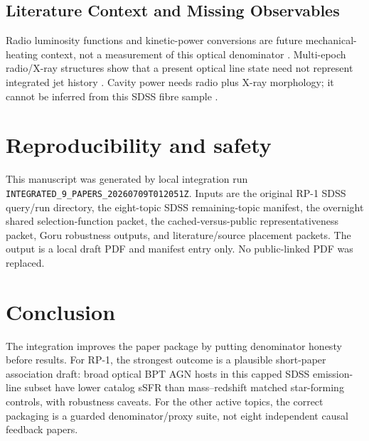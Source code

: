 \documentclass[twocolumn]{aastex702}
\begin{document}
\subsection{Literature Context and Missing Observables}

Radio luminosity functions and kinetic-power conversions are future mechanical-heating context, not a measurement of this optical denominator \citep{kondapally2023}. Multi-epoch radio/X-ray structures show that a present optical line state need not represent integrated jet history \citep{ubertosi2024}. Cavity power needs radio plus X-ray morphology; it cannot be inferred from this SDSS fibre sample \citep{timmerman2022}.

\section{Reproducibility and safety}\label{sec:repro}
This manuscript was generated by local integration run \texttt{INTEGRATED\_9\_PAPERS\_20260709T012051Z}. Inputs are the original RP-1 SDSS query/run directory, the eight-topic SDSS remaining-topic manifest, the overnight shared selection-function packet, the cached-versus-public representativeness packet, Goru robustness outputs, and literature/source placement packets. The output is a local draft PDF and manifest entry only. No public-linked PDF was replaced.

\section{Conclusion}\label{sec:conclusion}
The integration improves the paper package by putting denominator honesty before results. For RP-1, the strongest outcome is a plausible short-paper association draft: broad optical BPT AGN hosts in this capped SDSS emission-line subset have lower catalog sSFR than mass--redshift matched star-forming controls, with robustness caveats. For the other active topics, the correct packaging is a guarded denominator/proxy suite, not eight independent causal feedback papers.
\end{document}

